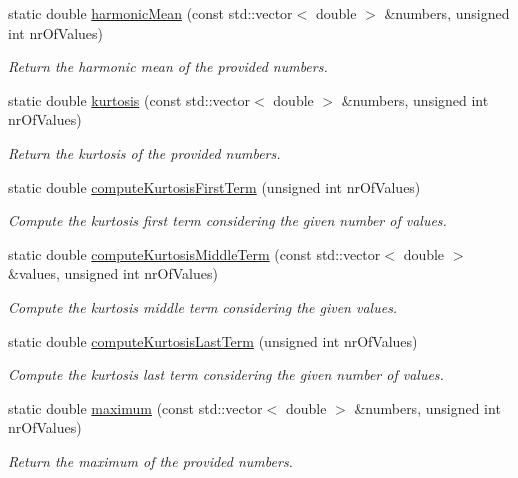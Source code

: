 \begin{DoxyCompactItemize}
static double \hyperlink{classmultiscale_1_1Numeric_a5d8213db60a274b34b0fa69ce7f02490}{harmonic\-Mean} (const std\-::vector$<$ double $>$ \&numbers, unsigned int nr\-Of\-Values)
\begin{DoxyCompactList}\small\item\em Return the harmonic mean of the provided numbers. \end{DoxyCompactList}\item 
static double \hyperlink{classmultiscale_1_1Numeric_ac857b047aafebf89a351bd7e7c3793eb}{kurtosis} (const std\-::vector$<$ double $>$ \&numbers, unsigned int nr\-Of\-Values)
\begin{DoxyCompactList}\small\item\em Return the kurtosis of the provided numbers. \end{DoxyCompactList}\item 
static double \hyperlink{classmultiscale_1_1Numeric_a6b506c0f002473f90df77068c1ac9d58}{compute\-Kurtosis\-First\-Term} (unsigned int nr\-Of\-Values)
\begin{DoxyCompactList}\small\item\em Compute the kurtosis first term considering the given number of values. \end{DoxyCompactList}\item 
static double \hyperlink{classmultiscale_1_1Numeric_a6c5a2d3f9af009d468211ee64b752bc4}{compute\-Kurtosis\-Middle\-Term} (const std\-::vector$<$ double $>$ \&values, unsigned int nr\-Of\-Values)
\begin{DoxyCompactList}\small\item\em Compute the kurtosis middle term considering the given values. \end{DoxyCompactList}\item 
static double \hyperlink{classmultiscale_1_1Numeric_a6b19a533b336330dc7c77eb9b8b7988b}{compute\-Kurtosis\-Last\-Term} (unsigned int nr\-Of\-Values)
\begin{DoxyCompactList}\small\item\em Compute the kurtosis last term considering the given number of values. \end{DoxyCompactList}\item 
static double \hyperlink{classmultiscale_1_1Numeric_ad7fb3a217ab798c89813c7fd2ff1fb0d}{maximum} (const std\-::vector$<$ double $>$ \&numbers, unsigned int nr\-Of\-Values)
\begin{DoxyCompactList}\small\item\em Return the maximum of the provided numbers. \end{DoxyCompactList}\item 

\end{DoxyCompactItemize}

